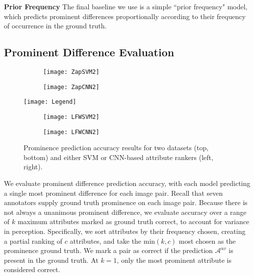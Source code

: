 \documentclass[10pt,twocolumn,letterpaper]{article}
\begin{document}
\vspace{0.22cm}

\noindent \textbf{Prior Frequency} \hspace{1em} The final baseline we use is a simple ``prior frequency" model, which predicts prominent differences proportionally according to their frequency of occurrence in the ground truth.

\subsection{Prominent Difference Evaluation} \label{evaluation}

\begin{figure}[t]
    \centering
    \begin{subfigure}[c]{0.49\linewidth}
        \centering
        \texttt{[image: ZapSVM2]}
        \label{fig:zapsvm}
    \end{subfigure}
    \hfill
    \begin{subfigure}[c]{0.49\linewidth}
        \centering
        \texttt{[image: ZapCNN2]}
        \label{fig:zapcnn}
    \end{subfigure}
    
    \vspace{-0.2cm}
    
    \texttt{[image: Legend]}
    
    \vspace{0.1cm}
    
    \begin{subfigure}[c]{0.49\linewidth}
        \centering
        \texttt{[image: LFWSVM2]}
        \label{fig:lfwsvm}
    \end{subfigure}
    \hfill
    \begin{subfigure}[c]{0.49\linewidth}
        \centering
        \texttt{[image: LFWCNN2]}
        \label{fig:lfwcnn}
    \end{subfigure}
    
    \vspace{-0.2cm}
    
    \caption[Prominence Evaluation Accuracy]{Prominence prediction accuracy results for two datasets (top, bottom) and either SVM or CNN-based attribute rankers (left, right).}
    \label{fig:eval}
\end{figure}

We evaluate prominent difference prediction accuracy, with each model predicting a single most prominent difference for each image pair. Recall that seven annotators supply ground truth prominence on each image pair. Because there is not always a unanimous prominent difference, we evaluate accuracy over a range of $k$ maximum attributes marked as ground truth correct, to account for variance in perception. Specifically, we sort attributes by their frequency chosen, creating a partial ranking of $c$ attributes, and take the $\text{min}(k, c)$ most chosen as the prominence ground truth. We mark a pair as correct if the prediction $\mathcal{A}^{uv}$ is present in the ground truth. At $k = 1$, only the most prominent attribute is considered correct.
\end{document}
